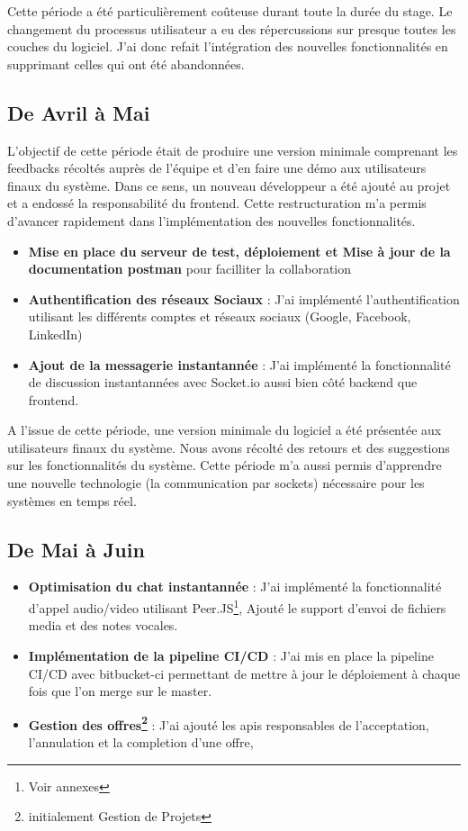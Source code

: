 {\vspace{1cm}
Cette période a été particulièrement coûteuse durant toute la durée du stage. Le changement du processus utilisateur a eu des répercussions sur presque toutes les couches du logiciel. J'ai donc refait l'intégration des nouvelles fonctionnalités en supprimant celles qui ont été abandonnées.

\subsection*{De Avril à Mai}

L'objectif de cette période était de produire une version minimale comprenant les feedbacks récoltés auprès de l'équipe et d'en faire une démo aux utilisateurs finaux du système. Dans ce sens, un nouveau développeur a été ajouté au projet et a endossé la responsabilité du frontend. Cette restructuration m'a permis d'avancer rapidement dans l'implémentation des nouvelles fonctionnalités.\\

\begin{itemize}
    \item \textbf{Mise en place du serveur de test, déploiement et Mise à jour de la documentation postman}  pour facilliter la collaboration
    \item \textbf{Authentification des réseaux Sociaux} : J'ai implémenté l'authentification utilisant les différents comptes et réseaux sociaux (Google, Facebook, LinkedIn)
    \item \textbf{Ajout de la messagerie instantannée} : J'ai implémenté la fonctionnalité de discussion instantannées avec Socket.io aussi bien côté backend que frontend.
\end{itemize}
\vspace{1cm}

A l'issue de cette période, une version minimale du logiciel a été présentée aux utilisateurs finaux du système. Nous avons récolté des retours et des suggestions sur les fonctionnalités du système. 
Cette période m'a aussi permis d'apprendre une nouvelle technologie (la communication par sockets) nécessaire pour les systèmes en temps réel. 

\subsection*{De Mai à Juin}

\begin{itemize}
    \item \textbf{Optimisation du chat instantannée} : J'ai implémenté la fonctionnalité d'appel audio/video utilisant Peer.JS\footnote{Voir annexes}, Ajouté le support d'envoi de fichiers media et des notes vocales. 
    \item \textbf{Implémentation de la pipeline CI/CD} : J'ai mis en place la pipeline CI/CD avec bitbucket-ci permettant de mettre à jour le déploiement à chaque fois que l'on merge sur le master.
    \item \textbf{Gestion des offres\footnote{initialement Gestion de Projets}} : J'ai ajouté les apis responsables de l'acceptation, l'annulation et la completion d'une offre, 
\end{itemize}

}
